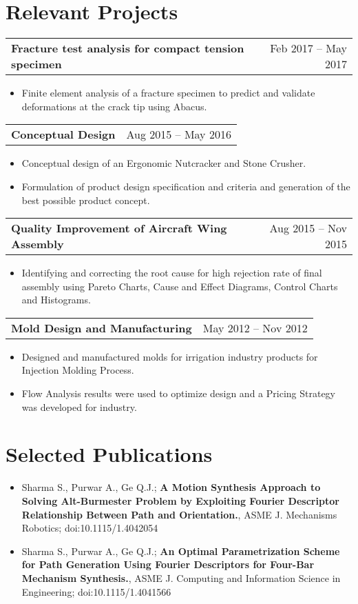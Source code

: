 \documentclass[letterpaper,10pt]{article}
\makeatletter
\newcommand{\resumeHeadingwithDate}[2]{
	\vspace{-1pt}
	\begin{tabular*}{0.97\textwidth}{l@{\extracolsep{\fill}}r}
		\textbf{#1} & #2 \vspace{-2pt}\\
	\end{tabular*}
	\vspace{+2pt}
}
\newcommand{\resumeSection}[1]{
\vspace{-12pt}
\section{\textbf{#1}}
}
\newcommand{\resumeItemListStart}{
\vspace{-7pt}
\begin{itemize}[leftmargin=14pt]
}
\newcommand{\resumeItemListEnd}{
\vspace{+7pt}
\end{itemize}
}
\newcommand{\resumeItem}[1]{
  \item\small{
      {#1 \vspace{-7pt}
      }
  }
}
\makeatother
\begin{document}
    \resumeSection{Relevant Projects}
    
    \resumeHeadingwithDate{Fracture test analysis for compact tension specimen}{Feb 2017 -- May 2017}
    \resumeItemListStart
    	\resumeItem{Finite element analysis of a fracture specimen to predict and validate deformations at the crack tip using Abacus.}
    \resumeItemListEnd
    
    \vspace{-4pt}
    \resumeHeadingwithDate{Conceptual Design}{Aug 2015 -- May 2016}
    \resumeItemListStart
    \resumeItem{Conceptual design of an Ergonomic Nutcracker and Stone Crusher.}
    \resumeItem{Formulation of product design specification and criteria and generation of the best possible product concept.}
    \resumeItemListEnd
    
    \vspace{-4pt}
    \resumeHeadingwithDate{Quality Improvement of Aircraft Wing Assembly}{Aug 2015 -- Nov 2015}
    \resumeItemListStart
    \resumeItem{Identifying and correcting the root cause for high rejection rate of final assembly using Pareto Charts, Cause and Effect Diagrams, Control Charts and Histograms.}
    \resumeItemListEnd
    
    \vspace{-4pt}
    \resumeHeadingwithDate{Mold Design and Manufacturing}{May 2012 -- Nov 2012}
    \resumeItemListStart
    \resumeItem{Designed and manufactured molds for irrigation industry products for Injection Molding Process.}
    \resumeItem{Flow Analysis results were used to optimize design and a Pricing Strategy was developed for industry.}
    \resumeItemListEnd
    

\resumeSection{Selected Publications}
\vspace{+7pt}
    \resumeItemListStart
    
      \resumeItem{Sharma S., Purwar A., Ge Q.J.; \textbf{A Motion Synthesis Approach to Solving Alt-Burmester Problem by Exploiting Fourier Descriptor Relationship Between Path and Orientation.}, ASME J. Mechanisms Robotics; doi:10.1115/1.4042054}
      \resumeItem{Sharma S., Purwar A., Ge Q.J.; \textbf{An Optimal Parametrization Scheme for Path Generation Using Fourier Descriptors for Four-Bar Mechanism Synthesis.}, ASME J. Computing and Information Science in Engineering; doi:10.1115/1.4041566}
      
    \resumeItemListEnd
\end{document}
